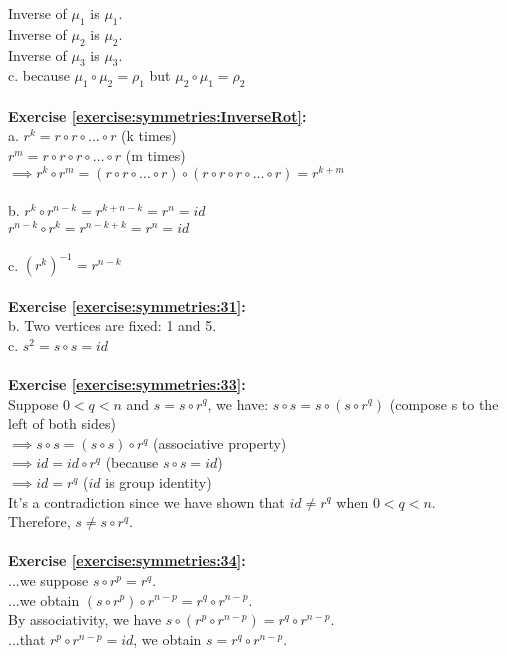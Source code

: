 Inverse of $\mu_1$ is $\mu_1$.\\
Inverse of $\mu_2$ is $\mu_2$.\\
Inverse of $\mu_3$ is $\mu_3$.\\
c. because $\mu_1\circ \mu_2 = \rho_1$ but $\mu_2\circ \mu_1=\rho_2$\\
\\
\textbf{Exercise \ref{exercise:symmetries:InverseRot}:}\\
a. $r^k=r\circ r\circ\dots \circ r$ (k times)\\
$r^m=r\circ r\circ r\circ\dots \circ r$ (m times)\\
$\implies r^k\circ r^m=(r\circ r\circ\dots \circ r)\circ(r\circ r\circ r\circ\dots \circ r)=r^{k+m}$\\
\\
b. $r^k\circ r^{n-k}=r^{k+n-k}=r^n=id$\\
$r^{n-k}\circ r^{k}=r^{n-k+k}=r^n=id$\\
\\
c. $(r^k)^{-1}=r^{n-k}$\\
\\
\textbf{Exercise \ref{exercise:symmetries:31}:}\\
b. Two vertices are fixed: 1 and 5.\\
c. $s^2=s\circ s=id$\\
\\
\textbf{Exercise \ref{exercise:symmetries:33}:}\\
Suppose $0<q<n$ and $s=s\circ r^q$, we have:
$s\circ s=s\circ(s\circ r^q)$ (compose s to the left of both sides)\\
$\implies s\circ s=(s\circ s)\circ r^q$ (associative property)\\
$\implies id=id\circ r^q$ (because $s\circ s=id$)\\
$\implies id=r^q$ ($id$ is group identity)\\
It's a contradiction since we have shown that $id\neq r^q$ when $0<q<n$.\\
Therefore, $s\neq s\circ r^q$.\\
\\
\textbf{Exercise \ref{exercise:symmetries:34}:}\\
...we suppose $s\circ r^p=r^q$.\\
...we obtain $(s\circ r^p)\circ r^{n-p}=r^q\circ r^{n-p}$.\\
By associativity, we have $s\circ (r^p\circ r^{n-p})=r^q\circ r^{n-p}$.\\
...that $r^p\circ r^{n-p}=id$, we obtain $s=r^q\circ r^{n-p}$.\\
